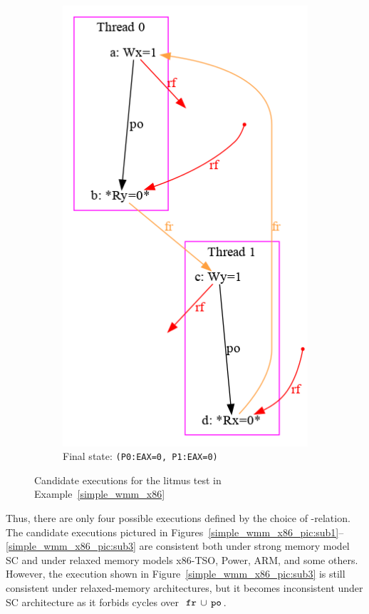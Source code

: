 \begin{figure}[!htb]
\begin{subfigure}[t]{.23\textwidth}
  \includegraphics[width=.9\linewidth]{img/my/sb-example/SB-dot-4.png}
  \caption{Final state: \texttt{(P0:EAX=0,~P1:EAX=0)}}
  \label{simple_wmm_x86_pic:sub4}
\end{subfigure}
\hfill
\caption{Candidate executions for the litmus test in Example~\ref{simple_wmm_x86}}
\label{simple_wmm_x86_pic}
\end{figure}

Thus, there are only four possible executions defined by the choice of \rf-relation.
The candidate executions pictured in Figures~\ref{simple_wmm_x86_pic:sub1}--\ref{simple_wmm_x86_pic:sub3} are consistent both under strong memory model SC and under relaxed memory models x86-TSO, Power, ARM, and some others.
However, the execution shown in Figure~\ref{simple_wmm_x86_pic:sub3} is still consistent under relaxed-memory architectures, but it becomes inconsistent under SC architecture as it forbids cycles over~$\,\texttt{fr}\,\cup\,\texttt{po}\,$.


